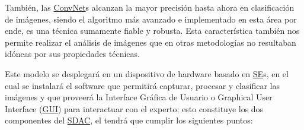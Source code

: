 También, las \hyperlink{abbr}{ConvNet}s alcanzan la mayor precisión hasta ahora
en clasificación de imágenes, siendo el algoritmo más avanzado e implementado en
esta área por ende, es una técnica sumamente fiable y robusta. Esta
característica también nos permite realizar el análisis de imágenes que en otras
metodologías no resultaban idóneas por sus propiedades
técnicas.~\cite{Litjens2017}

Este modelo se desplegará en un dispositivo de hardware basado en
\hyperlink{abbr}{SE}s, en el cual se instalará el software que permitirá
capturar, procesar y clasificar las imágenes y que proveerá la Interface Gráfica
de Usuario o Graphical User Interface
(\hyperlink{abbr}{GUI}) para
interactuar con el experto; esto constituye los dos componentes del
\hyperlink{abbr}{SDAC}, el tendrá que cumplir los siguientes puntos:

